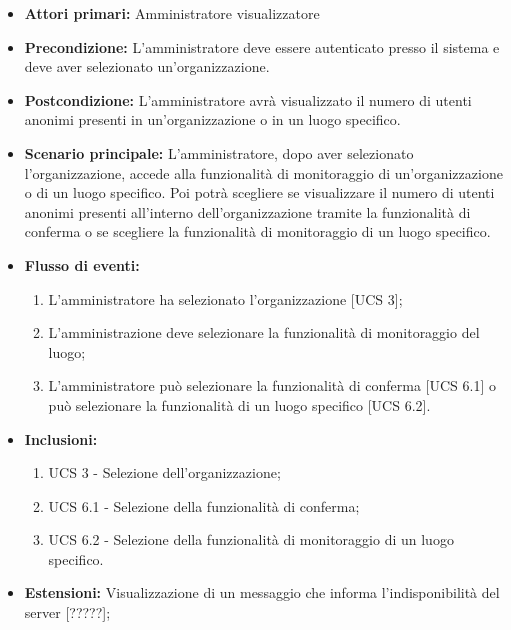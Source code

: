 \begin{itemize}
	\item \textbf{Attori primari:} Amministratore visualizzatore
	\item \textbf{Precondizione:} L'amministratore deve essere autenticato presso il sistema e deve aver selezionato un'organizzazione.
	\item \textbf{Postcondizione:} L'amministratore avrà visualizzato il numero di utenti anonimi presenti in un'organizzazione o in un luogo specifico.
	\item \textbf{Scenario principale:} L'amministratore, dopo aver selezionato l'organizzazione, accede alla funzionalità di monitoraggio di un'organizzazione o di un luogo specifico. Poi potrà scegliere se visualizzare il numero di utenti anonimi presenti all'interno dell'organizzazione tramite la funzionalità di conferma o se scegliere la funzionalità di monitoraggio di un luogo specifico.
	\item \textbf{Flusso di eventi:}
\begin{enumerate}
	\item L'amministratore ha selezionato l'organizzazione [UCS 3];
	\item L'amministrazione deve selezionare la funzionalità di monitoraggio del luogo;
	\item L'amministratore può selezionare la funzionalità di conferma [UCS 6.1] o può selezionare la funzionalità di un luogo specifico [UCS 6.2].
\end{enumerate}
\item \textbf{Inclusioni:}
\begin{enumerate}
    \item UCS 3 - Selezione dell'organizzazione;
    \item UCS 6.1 - Selezione della funzionalità di conferma;
    \item UCS 6.2 - Selezione della funzionalità di monitoraggio di un luogo specifico.
\end{enumerate}
\item \textbf{Estensioni:}  Visualizzazione di un messaggio che informa l'indisponibilità del server [?????];
\end{itemize}

